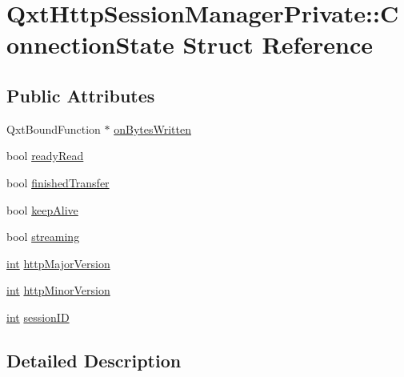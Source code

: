 \hypertarget{struct_qxt_http_session_manager_private_1_1_connection_state}{\section{Qxt\-Http\-Session\-Manager\-Private\-:\-:Connection\-State Struct Reference}
\label{struct_qxt_http_session_manager_private_1_1_connection_state}
}
\subsection*{Public Attributes}
\begin{DoxyCompactItemize}
\item 
Qxt\-Bound\-Function $\ast$ \hyperlink{struct_qxt_http_session_manager_private_1_1_connection_state_aedb3b55fbb0fce751f5c74419d553964}{on\-Bytes\-Written}
\item 
bool \hyperlink{struct_qxt_http_session_manager_private_1_1_connection_state_a8b770b73ac3b307698d6e180a5826dd8}{ready\-Read}
\item 
bool \hyperlink{struct_qxt_http_session_manager_private_1_1_connection_state_adabc4a155cc3195b04b0b2398d3030e0}{finished\-Transfer}
\item 
bool \hyperlink{struct_qxt_http_session_manager_private_1_1_connection_state_a2203300ba2fcd904fa95ab659950cf94}{keep\-Alive}
\item 
bool \hyperlink{struct_qxt_http_session_manager_private_1_1_connection_state_a7b31008523e2809e189670c4bcece433}{streaming}
\item 
\hyperlink{ioapi_8h_a787fa3cf048117ba7123753c1e74fcd6}{int} \hyperlink{struct_qxt_http_session_manager_private_1_1_connection_state_ab92eee2c71650b2385079c1fc2af24ee}{http\-Major\-Version}
\item 
\hyperlink{ioapi_8h_a787fa3cf048117ba7123753c1e74fcd6}{int} \hyperlink{struct_qxt_http_session_manager_private_1_1_connection_state_aaf604b5aaa45176893d82d4014642dca}{http\-Minor\-Version}
\item 
\hyperlink{ioapi_8h_a787fa3cf048117ba7123753c1e74fcd6}{int} \hyperlink{struct_qxt_http_session_manager_private_1_1_connection_state_a0becaf4b1c6826adc8707bb9b3108ab5}{session\-I\-D}
\end{DoxyCompactItemize}


\subsection{Detailed Description}



